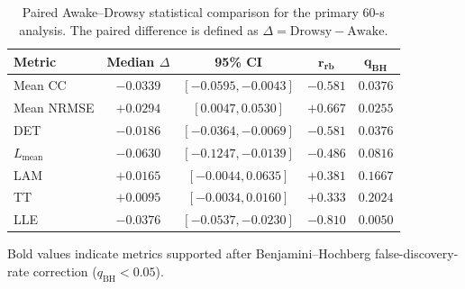 \begin{table}[t]
    \centering
    \caption{Paired Awake--Drowsy statistical comparison for the primary $60$-s analysis. The paired difference is defined as $\Delta=\mathrm{Drowsy}-\mathrm{Awake}$.}
    \label{tab:awake_drowsy_statistics}
    \footnotesize
    \setlength{\tabcolsep}{3.2pt}
    \renewcommand{\arraystretch}{1.08}

    \begin{tabular}{lcccc}
        \toprule
        \textbf{Metric}
        & \textbf{Median $\Delta$}
        & \textbf{95\% CI}
        & $\mathbf{r_{rb}}$
        & $\mathbf{q_{BH}}$ \\
        \midrule

        Mean CC
        & $-0.0339$
        & $[-0.0595,-0.0043]$
        & $-0.581$
        & $\mathbf{0.0376}$ \\

        Mean NRMSE
        & $+0.0294$
        & $[0.0047,0.0530]$
        & $+0.667$
        & $\mathbf{0.0255}$ \\

        DET
        & $-0.0186$
        & $[-0.0364,-0.0069]$
        & $-0.581$
        & $\mathbf{0.0376}$ \\

        $L_{\mathrm{mean}}$
        & $-0.0630$
        & $[-0.1247,-0.0139]$
        & $-0.486$
        & $0.0816$ \\

        LAM
        & $+0.0165$
        & $[-0.0044,0.0635]$
        & $+0.381$
        & $0.1667$ \\

        TT
        & $+0.0095$
        & $[-0.0034,0.0160]$
        & $+0.333$
        & $0.2024$ \\

        LLE
        & $-0.0376$
        & $[-0.0537,-0.0230]$
        & $-0.810$
        & $\mathbf{0.0050}$ \\

        \bottomrule
    \end{tabular}

    \vspace{1mm}

    \begin{minipage}{0.97\columnwidth}
        \footnotesize
        Bold values indicate metrics supported after Benjamini--Hochberg false-discovery-rate correction ($q_{\mathrm{BH}}<0.05$).
    \end{minipage}
\end{table}


